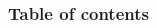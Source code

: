 \begin{frame}
   \frametitle{Table of contents}
   \begin{columns}
      \begin{column}{.45\textwidth}
         \tableofcontents
      \end{column}
      \begin{column}{.55\textwidth}
      \end{column}
   \end{columns}
\end{frame}
